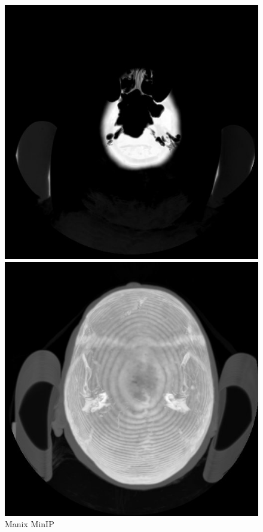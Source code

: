 \documentclass[a4paper,11pt]{article}
\begin{document}
\begin{figure}[!h]
	\begin{minipage}[c]{.22\linewidth}
     \center
	\includegraphics[scale=0.25]{manix_MinIP.jpg}
	\caption{Manix MinIP}
   \end{minipage} \hfill
	\begin{minipage}[c]{.22\linewidth}
      \center
	\includegraphics[scale=0.25]{manix_MIP.jpg}

\end{minipage}
\end{figure}
\end{document}
